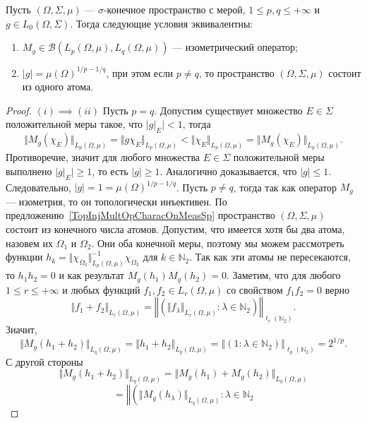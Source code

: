 \begin{proposition}\label{IsomMultOpCharacOnMeasSp} Пусть $(\Omega,\Sigma,\mu)$
--- $\sigma$-конечное пространство с мерой, $1\leq p,q\leq +\infty$ и 
$g\in L_0(\Omega,\Sigma)$. Тогда следующие условия эквивалентны:

\begin{enumerate}[label = (\roman*)]
    \item $M_g\in\mathcal{B}(L_p(\Omega,\mu),L_q(\Omega,\mu))$ --- 
    изометрический оператор;

    \item $|g|={\mu(\Omega)}^{1/p-1/q}$, при этом если $p\neq q$, 
    то пространство $(\Omega,\Sigma,\mu)$ состоит из одного атома.
\end{enumerate}
\end{proposition}
\begin{proof} $(i) \implies (ii)$ Пусть $p=q$. Допустим существует множество
$E\in\Sigma$ положительной меры такое, что $|g|_E|<1$, тогда
$$
\Vert M_g(\chi_E)\Vert_{L_p(\Omega,\mu)}
=\Vert g \chi_E\Vert_{L_p(\Omega,\mu)}
<\Vert\chi_E\Vert_{L_p(\Omega,\mu)}
=\Vert M_g(\chi_E)\Vert_{L_p(\Omega,\mu)}.
$$
Противоречие, значит для любого множества  $E\in\Sigma$ положительной меры
выполнено $|g|_E|\geq 1$, то есть $|g|\geq 1$. Аналогично доказывается, что
$|g|\leq 1$. Следовательно, $|g|=1={\mu(\Omega)}^{1/p-1/q}$. Пусть $p\neq q$,
тогда так как оператор $M_g$ --- изометрия, то он топологически инъективен. По
предложению~\ref{TopInjMultOpCharacOnMeasSp} пространство $(\Omega,\Sigma,\mu)$
состоит из конечного числа атомов. Допустим, что имеется хотя бы два атома,
назовем их $\Omega_1$ и $\Omega_2$. Они оба конечной меры, поэтому мы можем
рассмотреть функции
$h_k=\Vert\chi_{\Omega_k}\Vert_{L_p(\Omega,\mu)}^{-1}\chi_{\Omega_k}$ для
$k\in\mathbb{N}_2$. Так как эти атомы не пересекаются, то $h_1h_2=0$ и как
результат $M_g(h_1)M_g(h_2)=0$. Заметим, что для любого $1\leq r\leq +\infty$ и
любых функций $f_1,f_2\in L_r(\Omega,\mu)$ со свойством $f_1f_2=0$ верно
$$
\Vert f_1+f_2\Vert_{L_r(\Omega,\mu)}
=\left\Vert\left(\Vert f_\lambda\Vert_{L_r(\Omega,\mu)}
:\lambda\in\mathbb{N}_2\right)\right\Vert_{\ell_r(\mathbb{N}_2)}.
$$
Значит,
$$
\Vert M_g(h_1+h_2)\Vert_{L_q(\Omega,\mu)}
=\Vert h_1+h_2\Vert_{L_p(\Omega,\mu)}
=\left\Vert
    \left( 1 :\lambda\in\mathbb{N}_2\right)
\right\Vert_{\ell_p(\mathbb{N}_2)}
=2^{1/p}.
$$
С другой стороны
$$
\Vert M_g(h_1+h_2)\Vert_{L_q(\Omega,\mu)}
=\Vert M_g(h_1)+M_g(h_2)\Vert_{L_q(\Omega,\mu)}
$$
$$
=\left\Vert
    \left(
        \Vert M_g(h_\lambda)\Vert_{L_q(\Omega,\mu)}:\lambda\in\mathbb{N}_2
$$
\end{proof}
